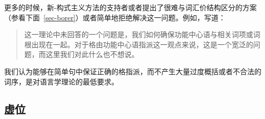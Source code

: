 \begin{exe}
\begin{xlist}[iv.]
\begin{exe}
\begin{xlist}[iv.]
更多的时候，新-构式主义方法的支持者或者提出了很难与词汇价结构区分的方案（参看下面~\ref{sec-borer}）或者简单地拒绝解决这一问题。例如，\citet{Lohndal2012a}写道：
\begin{quote}
这一理论中未回答的一个问题是，我们如何确保功能中心语与相关词项或词根出现在一起。对于格由功能中心语指派这一观点来说，这是一个宽泛的问题，而这里我们对此什么也不想说。\citep{Lohndal2012a}
\end{quote}
我们认为能够在简单句中保证正确的格指派，而不产生大量过度概括或者不合法的词序，是对语言学理论的最低要求。

\subsection{虚位}
\label{sec-expletives}


\end{xlist}
\end{exe}
\end{xlist}
\end{exe}
